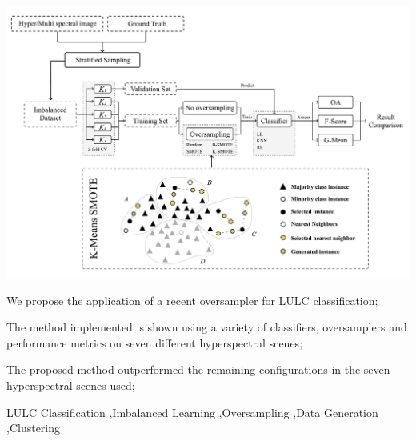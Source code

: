 \documentclass[authoryear,preprint,12pt]{elsarticle}
\begin{document}
\begin{frontmatter}
\begin{graphicalabstract}
\centering
\includegraphics[width=\linewidth]{../analysis/graphical_abstract}
\end{graphicalabstract}

\begin{highlights}
\item We propose the application of a recent oversampler for LULC
    classification;
\item The method implemented is shown using a variety of classifiers,
    oversamplers and performance metrics on seven different hyperspectral
    scenes;
\item The proposed method outperformed the remaining configurations in
    the seven hyperspectral scenes used;
\end{highlights}

\begin{keyword}
    LULC Classification \sep Imbalanced Learning \sep Oversampling \sep Data
    Generation \sep Clustering
\end{keyword}

\end{frontmatter}
\end{document}
